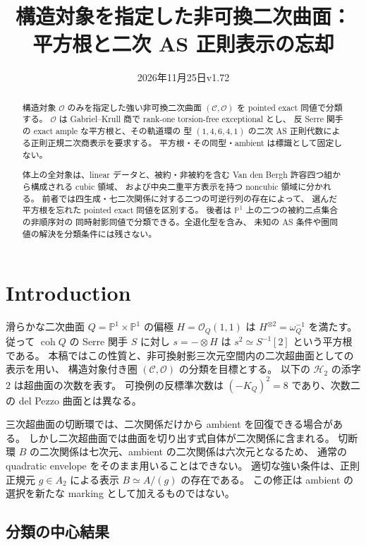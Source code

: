 \documentclass[a4paper,11pt]{ltjsarticle}
\title{構造対象を指定した非可換二次曲面：\\平方根と二次 AS 正則表示の忘却}
\author{}
\date{2026年11月25日\quad v1.72}
\numberwithin{equation}{section}
\theoremstyle{plain}
\theoremstyle{definition}
\theoremstyle{remark}
\newcommand{\OO}{\mathcal O}
\newcommand{\cC}{\mathcal C}
\newcommand{\PP}{\mathbb P}
\newcommand{\HH}{\mathcal H_2}
\DeclareMathOperator{\coh}{coh}
\begin{document}
\maketitle
\begin{abstract}
構造対象 $\OO$ のみを指定した強い非可換二次曲面
$(\cC,\OO)$ を pointed exact 同値で分類する。
$\OO$ は Gabriel--Krull 商で rank-one torsion-free exceptional とし、
反 Serre 関手の exact ample な平方根と、その軌道環の
型 $(1,4,6,4,1)$ の二次 AS 正則代数による正則正規二次商表示を要求する。
平方根・その同型・ambient は標識として固定しない。

体上の全対象は、linear データと、被約・非被約を含む
Van den Bergh 許容四つ組から構成される cubic 領域、
および中央二重平方表示を持つ noncubic 領域に分かれる。
前者では四生成・七二次関係に対する二つの可逆行列の存在によって、
選んだ平方根を忘れた pointed exact 同値を区別する。
後者は $\PP^1$ 上の二つの被約二点集合の非順序対の
同時射影同値で分類できる。全退化型を含み、
未知の AS 条件や圏同値の解決を分類条件には残さない。

\end{abstract}
\tableofcontents

\section{Introduction}
\label{sec:introduction}

滑らかな二次曲面 $Q=\PP^1\times\PP^1$ の偏極
$H=\OO_Q(1,1)$ は $H^{\otimes2}=\omega_Q^{-1}$ を満たす。
従って $\coh Q$ の Serre 関手 $S$ に対し
$s=-\otimes H$ は $s^2\simeq S^{-1}[2]$ という平方根である。
本稿ではこの性質と、非可換射影三次元空間内の二次超曲面としての表示を用い、
構造対象付き圏 $(\cC,\OO)$ の分類を目標とする。
以下の $\HH$ の添字 $2$ は超曲面の次数を表す。
可換例の反標準次数は $(-K_Q)^2=8$ であり、次数二の del Pezzo 曲面とは異なる。

三次超曲面の切断環では、二次関係だけから ambient を回復できる場合がある。
しかし二次超曲面では曲面を切り出す式自体が二次関係に含まれる。
切断環 $B$ の二次関係は七次元、ambient の二次関係は六次元となるため、
通常の quadratic envelope をそのまま用いることはできない。
適切な強い条件は、正則正規元 $g\in A_2$ による表示 $B\simeq A/(g)$ の存在である。
この修正は ambient の選択を新たな marking として加えるものではない。

\subsection{分類の中心結果}
\label{sec:intro-classification}
\end{document}
